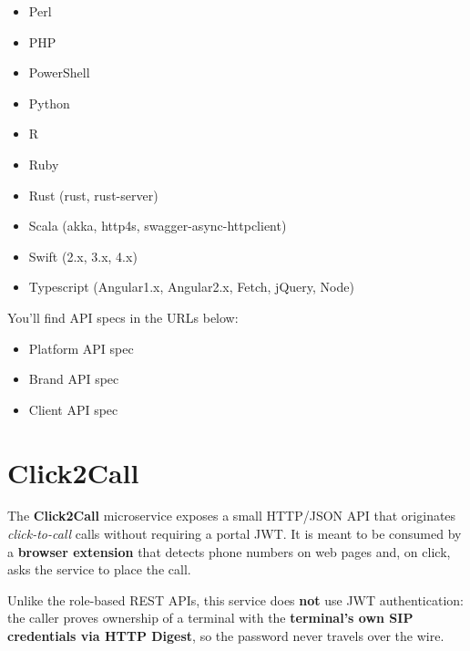\documentclass[letterpaper,10pt,english]{sphinxmanual}
\begin{document}
\begin{itemize}
\item {} 
Perl

\item {} 
PHP

\item {} 
PowerShell

\item {} 
Python

\item {} 
R

\item {} 
Ruby

\item {} 
Rust (rust, rust-server)

\item {} 
Scala (akka, http4s, swagger-async-httpclient)

\item {} 
Swift (2.x, 3.x, 4.x)

\item {} 
Typescript (Angular1.x, Angular2.x, Fetch, jQuery, Node)

\end{itemize}

You'll find API specs in the URLs below:
\begin{itemize}
\item {} 
Platform API spec

\item {} 
Brand API spec

\item {} 
Client API spec

\end{itemize}


\chapter{Click2Call}
\label{api_rest/click2call:click2call}\label{api_rest/click2call::doc}\label{api_rest/click2call:id1}
The \textbf{Click2Call} microservice exposes a small HTTP/JSON API that originates
\emph{click-to-call} calls without requiring a portal JWT. It is meant to be consumed
by a \textbf{browser extension} that detects phone numbers on web pages and, on click,
asks the service to place the call.

Unlike the role-based REST APIs, this service does \textbf{not} use JWT authentication:
the caller proves ownership of a terminal with the \textbf{terminal's own SIP
credentials via HTTP Digest}, so the password never travels over the wire.
\end{document}
